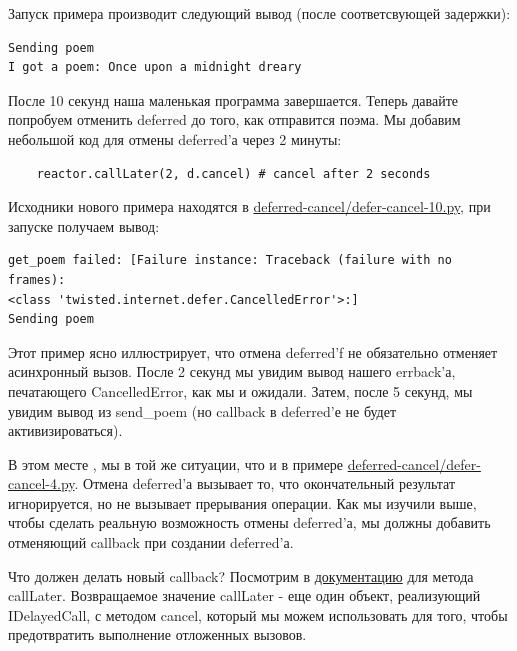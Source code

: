 Запуск примера производит следующий вывод (после соответсвующей задержки):

 \begin{scriptsize}\begin{verbatim}
Sending poem
I got a poem: Once upon a midnight dreary
\end{verbatim}\end{scriptsize}

После 10 секунд наша маленькая программа завершается. Теперь 
давайте попробуем отменить deferred до того, как отправится поэма. 
Мы добавим небольшой код для отмены deferred'а через 2 минуты:


\begin{scriptsize}\begin{verbatim}
    reactor.callLater(2, d.cancel) # cancel after 2 seconds
\end{verbatim}\end{scriptsize}

Исходники нового примера находятся в 
\href{http://github.com/jdavisp3/twisted-intro/blob/master/deferred-cancel/defer-cancel-10.py#L1}{deferred-cancel/defer-cancel-10.py}, при запуске получаем вывод:

\begin{scriptsize}\begin{verbatim}
get_poem failed: [Failure instance: Traceback (failure with no frames): 
<class 'twisted.internet.defer.CancelledError'>:]
Sending poem
\end{verbatim}\end{scriptsize}


Этот пример ясно иллюстрирует, что отмена deferred'f 
не обязательно отменяет асинхронный вызов. После 2 
секунд мы увидим вывод нашего errback'а, печатающего 
CancelledError, как мы и ожидали. Затем, после 5 секунд, 
мы увидим вывод из send\_poem (но callback в deferred'е не 
будет активизироваться).


В этом месте , мы в той же ситуации, что и в примере 
\href{http://github.com/jdavisp3/twisted-intro/blob/master/deferred-cancel/defer-cancel-4.py#L1}{deferred-cancel/defer-cancel-4.py}. Отмена deferred'а вызывает то, что окончательный 
результат игнорируется, но не вызывает прерывания операции. Как мы 
изучили выше, чтобы сделать реальную возможность 
отмены deferred'а, мы должны добавить отменяющий callback при 
создании deferred'а.


Что должен делать новый callback? Посмотрим в 
\href{http://twistedmatrix.com/trac/browser/tags/releases/twisted-10.1.0/twisted/internet/interfaces.py#L556}{документацию} для 
метода callLater. Возвращаемое значение callLater - еще 
один объект, реализующий IDelayedCall, с методом 
cancel, который мы можем использовать для того, чтобы 
предотвратить выполнение отложенных вызовов.



